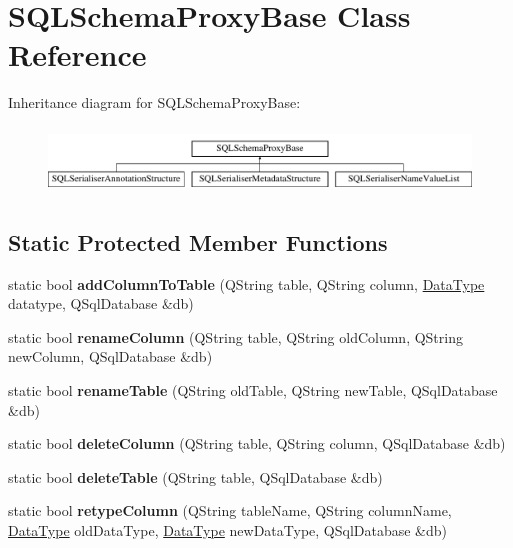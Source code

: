 \hypertarget{class_s_q_l_schema_proxy_base}{}\section{S\+Q\+L\+Schema\+Proxy\+Base Class Reference}
\label{class_s_q_l_schema_proxy_base}
Inheritance diagram for S\+Q\+L\+Schema\+Proxy\+Base\+:\begin{figure}[H]
\begin{center}
\leavevmode
\includegraphics[height=1.769352cm]{class_s_q_l_schema_proxy_base}
\end{center}
\end{figure}
\subsection*{Static Protected Member Functions}
\begin{DoxyCompactItemize}
\item 
\mbox{\label{class_s_q_l_schema_proxy_base_adfd279e02ca724d3e5e24cff8a7a9e47}} 
static bool {\bfseries add\+Column\+To\+Table} (Q\+String table, Q\+String column, \hyperlink{class_data_type}{Data\+Type} datatype, Q\+Sql\+Database \&db)
\item 
\mbox{\label{class_s_q_l_schema_proxy_base_a72967393484ffdb014a1f648af6879a5}} 
static bool {\bfseries rename\+Column} (Q\+String table, Q\+String old\+Column, Q\+String new\+Column, Q\+Sql\+Database \&db)
\item 
\mbox{\label{class_s_q_l_schema_proxy_base_a4ff2647da433d439612bd7cf0ad57808}} 
static bool {\bfseries rename\+Table} (Q\+String old\+Table, Q\+String new\+Table, Q\+Sql\+Database \&db)
\item 
\mbox{\label{class_s_q_l_schema_proxy_base_a437b7a84a966a2e830b3e6066436e739}} 
static bool {\bfseries delete\+Column} (Q\+String table, Q\+String column, Q\+Sql\+Database \&db)
\item 
\mbox{\label{class_s_q_l_schema_proxy_base_aa68aef040154c2dd8aed64a84f296a9a}} 
static bool {\bfseries delete\+Table} (Q\+String table, Q\+Sql\+Database \&db)
\item 
\mbox{\label{class_s_q_l_schema_proxy_base_a63393cd6f092b888b0304013d1125363}} 
static bool {\bfseries retype\+Column} (Q\+String table\+Name, Q\+String column\+Name, \hyperlink{class_data_type}{Data\+Type} old\+Data\+Type, \hyperlink{class_data_type}{Data\+Type} new\+Data\+Type, Q\+Sql\+Database \&db)
\end{DoxyCompactItemize}


